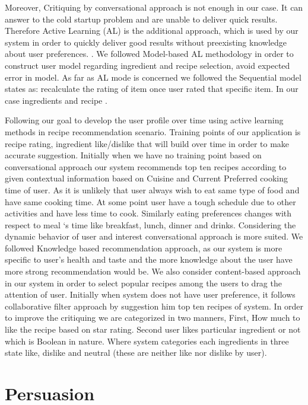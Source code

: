 Moreover, Critiquing by conversational approach is not enough in our case. It can answer to the cold startup problem and are unable to deliver quick results. Therefore Active Learning (AL) is the additional approach, which is used by our system in order to quickly deliver good results without preexisting knowledge about user preferences. \cite{lamche2014active}. We followed Model-based AL methodology in order to construct user model regarding ingredient and recipe selection, avoid expected error in model. As far as AL mode is concerned we followed the Sequential model states as: recalculate the rating of item once user rated that specific item. In our case ingredients and recipe \cite{rashid2008learning}.

Following our goal to develop the user profile over time using active learning methods in recipe recommendation scenario. Training points of our application is recipe rating, ingredient like/dislike that will build over time in order to make accurate suggestion. Initially when we have no training point based on conversational approach our system recommends top ten recipes according to given contextual information based on Cuisine and Current Preferred cooking time of user. As it is unlikely that user always wish to eat same type of food and have same cooking time. At some point user have a tough schedule due to other activities and have less time to cook. Similarly eating preferences changes with respect to meal ‘s time like breakfast, lunch, dinner and drinks. Considering the dynamic behavior of user and interest conversational approach is more suited. We followed Knowledge based recommendation approach, as our system is more specific to user’s health and taste and the more knowledge about the user have more strong recommendation would be. We also consider content-based approach in our system in order to select popular recipes among the users to drag the attention of user. Initially when system does not have user preference, it follows collaborative filter approach by suggestion him top ten recipes of system. In order to improve the critiquing we are categorized in two manners, First, How much to like the recipe based on star rating. Second user likes particular ingredient or not which is Boolean in nature. Where system categories each ingredients in three state like, dislike and neutral (these are neither like nor dislike by user).  
	
\section{Persuasion}

